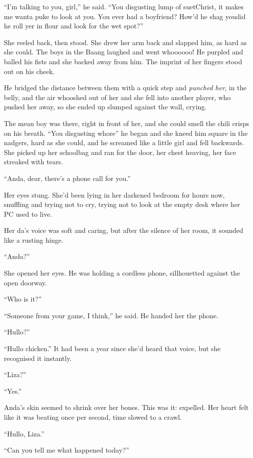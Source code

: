 “I’m talking to you, girl,” he said. “You disgusting lump of
suet\dash{}Christ, it makes me wanta puke to look at you. You ever had a
boyfriend? How’d he shag you\dash{}did he roll yer in flour and look for
the wet spot?”

She reeled back, then stood. She drew her arm back and slapped him,
as hard as she could. The boys in the Baang laughed and went
whoooooo! He purpled and balled his fists and she backed away from
him. The imprint of her fingers stood out on his cheek.

He bridged the distance between them with a quick step and
\emph{punched her}, in the belly, and the air whooshed out of her
and she fell into another player, who pushed her away, so she ended
up slumped against the wall, crying.

The mean boy was there, right in front of her, and she could smell
the chili crisps on his breath. “You disgusting whore\dash{}” he began
and she kneed him square in the nadgers, hard as she could, and he
screamed like a little girl and fell backwards. She picked up her
schoolbag and ran for the door, her chest heaving, her face
streaked with tears.

\tb

“Anda, dear, there’s a phone call for you.”

Her eyes stung. She’d been lying in her darkened bedroom for hours
now, snuffling and trying not to cry, trying not to look at the
empty desk where her PC used to live.

Her da’s voice was soft and caring, but after the silence of her
room, it sounded like a rusting hinge.

“Anda?”

She opened her eyes. He was holding a cordless phone, sillhouetted
against the open doorway.

“Who is it?”

“Someone from your game, I think,” he said. He handed her the
phone.

“Hullo?”

“Hullo chicken.” It had been a year since she’d heard that voice,
but she recognised it instantly.

“Liza?”

“Yes.”

Anda’s skin seemed to shrink over her bones. This was it: expelled.
Her heart felt like it was beating once per second, time slowed to
a crawl.

“Hullo, Liza.”

“Can you tell me what happened today?”

